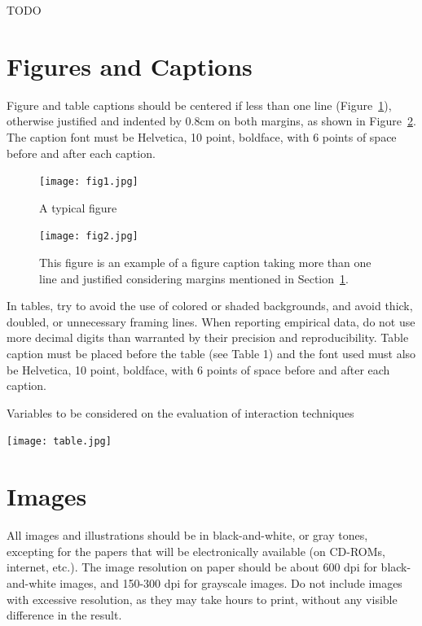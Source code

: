 \documentclass[12pt]{article}
\begin{document}
TODO

\section{Figures and Captions}\label{sec:figs}


Figure and table captions should be centered if less than one line
(Figure~\ref{fig:exampleFig1}), otherwise justified and indented by 0.8cm on
both margins, as shown in Figure~\ref{fig:exampleFig2}. The caption font must
be Helvetica, 10 point, boldface, with 6 points of space before and after each
caption.

\begin{figure}[ht]
\centering
\texttt{[image: fig1.jpg]}
\caption{A typical figure}
\label{fig:exampleFig1}
\end{figure}

\begin{figure}[ht]
\centering
\texttt{[image: fig2.jpg]}
\caption{This figure is an example of a figure caption taking more than one
  line and justified considering margins mentioned in Section~\ref{sec:figs}.}
\label{fig:exampleFig2}
\end{figure}

In tables, try to avoid the use of colored or shaded backgrounds, and avoid
thick, doubled, or unnecessary framing lines. When reporting empirical data,
do not use more decimal digits than warranted by their precision and
reproducibility. Table caption must be placed before the table (see Table 1)
and the font used must also be Helvetica, 10 point, boldface, with 6 points of
space before and after each caption.

\begin{table}[ht]
\centering
\caption{Variables to be considered on the evaluation of interaction
  techniques}
\label{tab:exTable1}
\texttt{[image: table.jpg]}
\end{table}

\section{Images}

All images and illustrations should be in black-and-white, or gray tones,
excepting for the papers that will be electronically available (on CD-ROMs,
internet, etc.). The image resolution on paper should be about 600 dpi for
black-and-white images, and 150-300 dpi for grayscale images.  Do not include
images with excessive resolution, as they may take hours to print, without any
visible difference in the result. 
\end{document}
